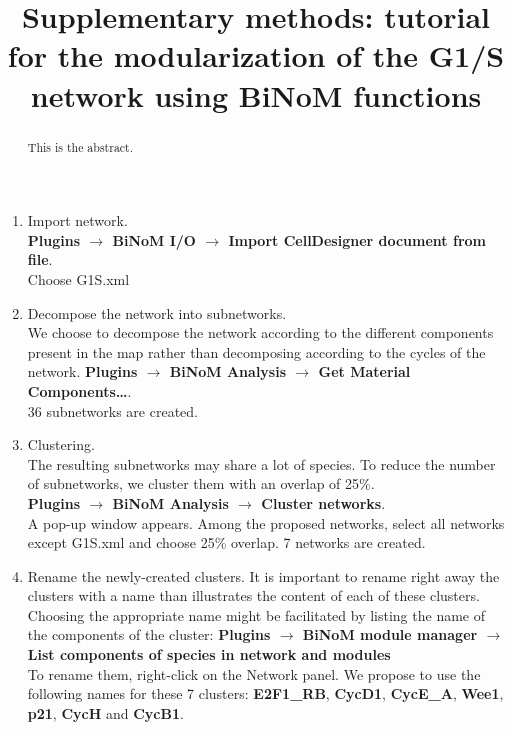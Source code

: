 \documentclass[a4paper,10pt]{article}
\title{Supplementary methods: tutorial for the modularization of the G1/S network using BiNoM functions}
\author{}
\begin{document}
\maketitle

\begin{abstract}
This is the abstract.
\end{abstract}


\begin{enumerate}
\item Import network. \\
\textbf{Plugins $\rightarrow$ BiNoM I/O $\rightarrow$ Import CellDesigner document
from file}.  \\
Choose G1S.xml


\item	Decompose the network into subnetworks. \\
We choose to decompose the network according to the different components present
in the map rather than decomposing according to the cycles of the network. 
\textbf{Plugins $\rightarrow$ BiNoM Analysis $\rightarrow$ Get Material
Components…}.\\
36 subnetworks are created.

\item	Clustering. \\
The resulting subnetworks may share a lot of species. To reduce the number of
subnetworks, we cluster them with an overlap of 25\%. \\
\textbf{Plugins $\rightarrow$ BiNoM Analysis $\rightarrow$ Cluster networks}. \\
A pop-up window appears. Among the proposed networks, select all networks except
G1S.xml and choose 25\% overlap. 7 networks are created.

\item	Rename the newly-created clusters.
It is important to rename right away the clusters with a name than illustrates
the content of each of these clusters. 
Choosing the appropriate name might be facilitated by listing the name of the
components of the cluster: \textbf{Plugins $\rightarrow$ BiNoM module manager
$\rightarrow$ List components of species in network and modules} \\
To rename them, right-click on the Network panel.
We propose to use the following names for these 7 clusters: \textbf{E2F1\_RB},
\textbf{CycD1}, \textbf{CycE\_A}, \textbf{Wee1}, \textbf{p21}, \textbf{CycH} and
\textbf{CycB1}.



\end{enumerate}
\end{document}
